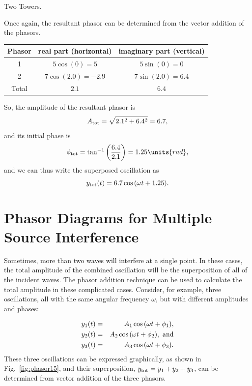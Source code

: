 \begin{exampleb}{Two Towers.}
\begin{solution}
Once again, the resultant phasor can be determined from the vector
addition of the phasors.

\renewcommand{\arraystretch}{2.0}
\begin{center}
\begin{tabular}{|c|c|c|}\hline
\quad Phasor\quad\mbox{} &
\quad real part (horizontal) \quad \mbox{}&
\quad imaginary part (vertical) \quad\mbox{} \\ 
\hline\hline
1      & $5\cos{\left(0\right)}=5$ & $5\sin{\left(0\right)}=0$ \\
\hline
2      & $7\cos{\left(2.0\right)}=-2.9$ & $7\sin{\left(2.0\right)}=6.4$ \\
\hline\hline
Total  & $2.1$   & $6.4$ \\
\hline
\end{tabular}
\end{center}
\renewcommand{\arraystretch}{1.0}
\vspace{0.08in}

So, the amplitude of the resultant phasor is 
\begin{equation}
A_{\rm tot} = \sqrt{2.1^2 + 6.4^2} = 6.7,
\end{equation}
and its initial phase is
\begin{equation}
\phi_{\rm tot} = \tan^{-1}{\left(\frac{6.4}{2.1}\right)} 
      = 1.25\units{rad},
\end{equation} 
and we can thus write the superposed oscillation as
\begin{equation}
y_{\rm tot}(t) = 6.7\cos{(\omega t + 1.25)}. 
\end{equation}
\end{solution}
\end{exampleb}

\section[Multi-Source Interference]{Phasor Diagrams for Multiple Source Interference}
\label{sec:phasors_multiple_source}

Sometimes, more than two waves will interfere at a single point. In
these cases, the total amplitude of the combined oscillation will be
the superposition of all of the incident waves. The phasor addition
technique can be used to calculate the total amplitude in these
complicated cases. Consider, for example, three oscillations, all with
the same angular frequency $\omega$, but with different amplitudes and
phases:

\begin{eqnarray*}
y_1(t) & = & A_1\cos{(\omega t + \phi_1)}, \\
y_2(t) & = & A_2\cos{(\omega t + \phi_2)}, \ {\rm and} \\
y_3(t) & = & A_3\cos{(\omega t + \phi_3)}.
\end{eqnarray*}
These three oscillations can be expressed graphically, as shown in 
Fig.~\ref{fig:phasor15},
 and their superposition, $y_{\rm tot} = y_1 + y_2 + y_3$, can
be determined from vector addition of the three phasors.



